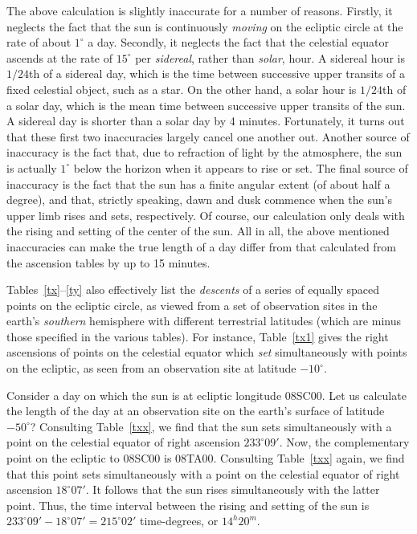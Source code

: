  The above calculation is slightly inaccurate for a number of reasons. Firstly, it neglects the
 fact that the sun is continuously {\em moving}\/ on the ecliptic circle at the rate of about $1^\circ$ a day.
 Secondly, it neglects the fact that the celestial equator ascends
 at the rate of $15^\circ$ per {\em sidereal}, rather than 
 {\em solar}, hour. A sidereal hour is $1/24$th of a sidereal day,
 which is the time between successive upper transits  of a fixed celestial object, such as a star. On the other hand, a solar hour is $1/24$th of a
 solar day, which is the mean time between successive upper transits
 of the sun. A sidereal day is shorter than a solar day by 4 minutes. 
 Fortunately, it turns out that these first two inaccuracies largely
 cancel one another out. Another source of inaccuracy is the fact that, due to
 refraction of light by the atmosphere, the sun is actually $1^\circ$ below
 the horizon when it appears to rise or set. The final source of inaccuracy
 is the fact that the sun has a finite angular extent (of about half a degree),
 and that, strictly speaking, dawn and dusk commence when the sun's upper limb rises and sets, respectively. Of course, our calculation
 only deals  with the rising and setting of the center of the sun. 
 All in all, the above mentioned inaccuracies can make the true length
 of a day differ from that calculated from the ascension tables by up
 to 15 minutes.
 
 Tables~\ref{tx}--\ref{ty} also effectively list the {\em descents}\/ of a series of equally spaced points on the ecliptic
circle, as viewed from a set of observation sites in the earth's {\em southern}\/
hemisphere with different terrestrial latitudes (which are minus those specified in the various tables). For instance,
Table~\ref{tx1} gives the right ascensions of points on the celestial equator which {\em set}\/ simultaneously
with points on the ecliptic, as seen from an observation site at latitude $-10^\circ$. 

Consider a day on which the sun is at ecliptic longitude 08SC00. Let us calculate the length of the day
at an observation site on the earth's surface of latitude $-50^\circ$? Consulting Table~\ref{txx}, we find that
the sun sets simultaneously with a point on the celestial equator of right ascension $233^\circ 09'$. Now,
the complementary point on the ecliptic to 08SC00 is 08TA00. Consulting Table~\ref{txx} again, we
find that this point sets simultaneously with a point on the celestial equator of
right ascension $18^\circ 07'$. It follows that the sun rises simultaneously with the latter point. 
Thus, the time interval between the rising and setting of the sun is $233^\circ 09'-18^\circ 07'=215^\circ 02'$
time-degrees, or $14^h 20^m$. 
 
